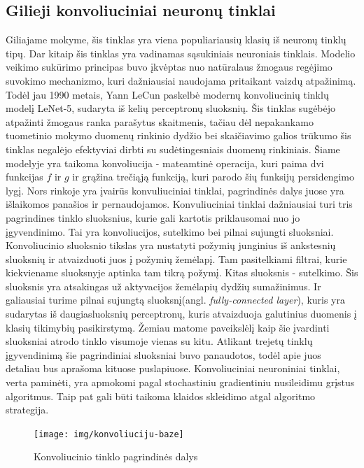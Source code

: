 \documentclass{VUMIFPSkursinis}
\DeclareRobustCommand{\[}{\begin{equation}}
\DeclareRobustCommand{\]}{\end{equation}}
\begin{document}
\subsection{Gilieji konvoliuciniai neuronų tinklai}
Giliajame mokyme, šis tinklas yra viena populiariausių klasių iš neuronų tinklų tipų. Dar kitaip šis tinklas yra vadinamas sąsukiniais neuroniais tinklais. Modelio veikimo sukūrimo principas buvo įkvėptas nuo natūralaus žmogaus regėjimo suvokimo mechanizmo, kuri dažniausiai naudojama pritaikant vaizdų atpažinimą. Todėl jau 1990 metais, Yann LeCun paskelbė modernų konvoliucinių tinklų modelį LeNet-5, sudaryta iš kelių perceptronų sluoksnių. Šis tinklas sugėbėjo atpažinti žmogaus ranka parašytus skaitmenis, tačiau dėl nepakankamo tuometinio mokymo duomenų rinkinio dydžio bei skaičiavimo galios trūkumo šis tinklas negalėjo efektyviai dirbti su sudėtingesniais duomenų rinkiniais. Šiame modelyje yra taikoma konvoliucija - mateamtinė operacija, kuri paima dvi funkcijas $f$ ir $g$ ir grąžina trečiąją funkciją, kuri parodo šių  funksijų persidengimo lygį. Nors rinkoje yra įvairūs konvuliuciniai tinklai, pagrindinės dalys juose yra išlaikomos panašios ir pernaudojamos. Konvuliuciniai tinklai dažniausiai turi tris pagrindines tinklo sluoksnius, kurie gali kartotis priklausomai nuo jo įgyvendinimo. Tai yra konvoliucijos, sutelkimo bei pilnai sujungti sluoksniai.
Konvoliucinio sluoksnio tikslas yra nustatyti požymių junginius iš ankstesnių sluoksnių ir atvaizduoti juos į požymių žemėlapį. Tam pasitelkiami filtrai, kurie kiekviename sluoksnyje  aptinka tam tikrą požymį. Kitas sluoksnis - sutelkimo. Šis sluoksnis yra atsakingas už aktyvacijos  žemėlapių dydžių sumažinimus. Ir galiausiai turime pilnai sujungtą sluoksnį(angl. \textit{fully-connected layer}), kuris yra sudarytas iš daugiasluoksnių perceptronų, kuris atvaizduoja galutinius duomenis į klasių tikimybių pasikirstymą.
Žemiau matome paveikslėlį kaip šie įvardinti sluoksniai atrodo tinklo visumoje vienas su kitu.
Atlikant trejetų tinklų įgyvendinimą šie pagrindiniai sluoksniai buvo panaudotos, todėl apie juos detaliau bus aprašoma kituose puslapiuose.
Konvoliuciniai	neuroniniai	tinklai, verta paminėti, yra apmokomi pagal	stochastiniu gradientiniu nusileidimu grįstus algoritmus. Taip pat gali būti taikoma klaidos skleidimo atgal algoritmo strategija.

\begin{figure}[H]
\centering
\texttt{[image: img/konvoliuciju-baze]}
\caption{Konvoliucinio tinklo pagrindinės dalys
\cite{Improved_triplet_network}} %
\label{img:mlp}
\end{figure}
\pagebreak
\end{document}
